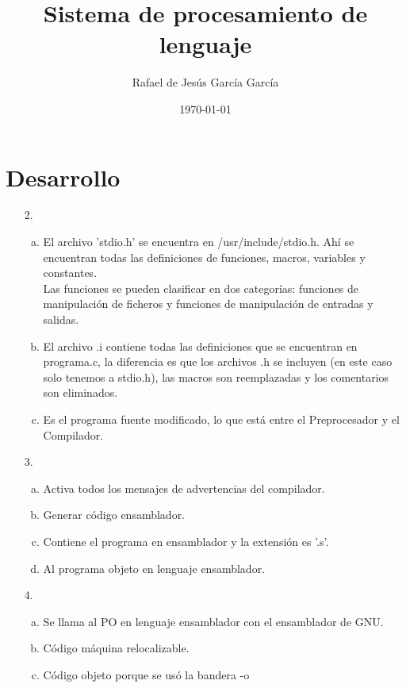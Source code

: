 \documentclass[12pt]{article}
\title{Sistema de procesamiento de lenguaje}
\date{\today}
\author{Rafael de Jesús García García}
\begin{document}
  \maketitle

  \section{Desarrollo}

    \begin{itemize}
      \item [2.]
      \begin{enumerate}[a)]
        \item El archivo 'stdio.h' se encuentra en /usr/include/stdio.h. Ahí
        se encuentran todas las definiciones de funciones, macros, variables y
        constantes. \\
        Las funciones se pueden clasificar en dos categorías: funciones de
        manipulación de ficheros y funciones de manipulación de entradas y salidas.
        \item El archivo .i contiene todas las definiciones que se encuentran en
        programa.c, la diferencia es que los archivos .h se incluyen (en este caso
        solo tenemos a stdio.h), las macros son reemplazadas y los comentarios
        son eliminados.
        \item Es el programa fuente modificado, lo que está entre el Preprocesador
        y el Compilador.
      \end{enumerate}
      \item [3.]
      \begin{enumerate}[a)]
        \item Activa todos los mensajes de advertencias del compilador.
        \item Generar código ensamblador.
        \item Contiene el programa en ensamblador y la extensión es '.s'.
        \item Al programa objeto en lenguaje ensamblador.
      \end{enumerate}
      \item [4.]
      \begin{enumerate}[a)]
        \item Se llama al PO en lenguaje ensamblador con el ensamblador de GNU.
        \item Código máquina relocalizable.
        \item Código objeto porque se usó la bandera -o

\end{enumerate}
\end{itemize}
\end{document}
